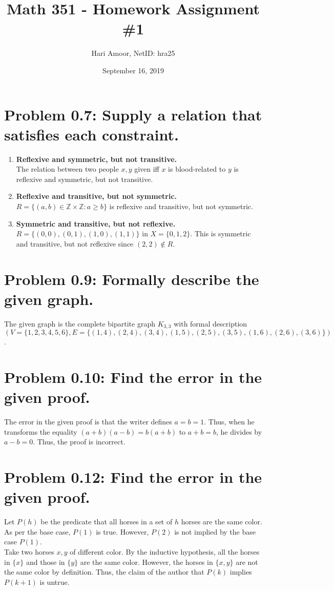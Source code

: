\documentclass[12pt]{article}
\title{Math 351 - Homework Assignment \#1}
\author{Hari Amoor, NetID: hra25}
\date{September 16, 2019}
\begin{document}
\maketitle

\section*{Problem 0.7: Supply a relation that satisfies each constraint.}
\begin{enumerate}[label=(\alph*)]
	\item \textbf{Reflexive and symmetric, but not transitive.} \\
		\newline
		The relation between two people $x, y$ given iff $x$ is blood-related to $y$ is reflexive and symmetric, but not transitive.
	\item \textbf{Reflexive and transitive, but not symmetric.} \\
		\newline
		$R = \{(a, b) \in \mathbb{Z} \times \mathbb{Z} : a \geq b\}$ is reflexive and transitive, but not symmetric.
	\item \textbf{Symmetric and transitive, but not reflexive.} \\
		\newline
		$R = \{(0, 0), (0, 1), (1, 0), (1, 1)\}$ in $X = \{0, 1, 2\}$. This is symmetric and transitive, but not reflexive since $(2, 2) \notin R$.
\end{enumerate}

\section*{Problem 0.9: Formally describe the given graph.}
The given graph is the complete bipartite graph $K_{3, 3}$ with formal description $(V = \{1, 2, 3, 4, 5, 6\}, E = \{(1, 4), (2, 4), (3, 4), (1, 5), (2, 5), (3, 5), (1, 6), (2, 6), (3, 6)\})$.

\section*{Problem 0.10: Find the error in the given proof.}
The error in the given proof is that the writer defines $a = b = 1$. Thus, when he transforms the equality $(a + b)(a - b) = b(a + b)$ to $a + b = b$, he divides by $a - b = 0$. Thus, the proof is incorrect.

\section*{Problem 0.12: Find the error in the given proof.}
Let $P(h)$ be the predicate that all horses in a set of $h$ horses are the same color. As per the base case, $P(1)$ is true. However, $P(2)$ is not implied by the base case $P(1)$. \\
\newline
Take two horses $x, y$ of different color. By the inductive hypothesis, all the horses in $\{x\}$ and those in $\{y\}$ are the same color. However, the horses in $\{x, y\}$ are not the same color by definition. Thus, the claim of the author that $P(k)$ implies $P(k + 1)$ is untrue.
\end{document}
